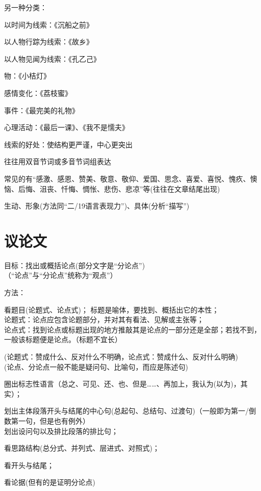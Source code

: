 另一种分类：\begin{asparaenum}[(1)]\item 以时间为线索：《沉船之前》
              \item 以人物行踪为线索：《故乡》
              \item 以人物见闻为线索：《孔乙己》
              \item 物：《小桔灯》
              \item 感情变化：《荔枝蜜》
              \item 事件：《最完美的礼物》
              \item 心理活动：《最后一课》、《我不是懦夫》\end{asparaenum}

线索的好处：使结构更严谨，中心更突出

  往往用双音节词或多音节词组表达

  常见的有``感激、感恩、赞美、敬意、敬仰、爱国、思念、喜爱、喜悦、愧疚、懊恼、后悔、沮丧、忏悔、惆怅、悲伤、悲凉''等(往往在文章结尾出现)

  生动、形象(方法同``二/19语言表现力'')、具体(分析``描写'')

\section{议论文}
目标：找出或概括论点(部分文字是``分论点'')\\
（``论点''与``分论点''统称为``观点''）\par
方法：\begin{asparaenum}[(1)]\item 看题目(论题式、论点式)；
标题是喻体，要找到、概括出它的本性；\\
论题式：论点应包含论题部分，并对其有看法、见解或主张等；\\
论点式：找到论点或标题出现的地方推敲其是论点的一部分还是全部；若找不到，一般该标题便是论点。（标题不宜长）\par
(论题式：赞成什么、反对什么不明确，论点式：赞成什么、反对什么明确)\\
(论点、分论点一般不能是疑问句、比喻句，而应是陈述句)

\item 圈出标志性语言（总之、可见、还、也、但是\ldots{}\ldots{}、再加上，我认为(以为)，其实）；
\item 划出主体段落开头与结尾的中心句(总起句、总结句、过渡句)（一般即为第一/倒数第一句，但是也有例外）\\划出设问句以及排比段落的排比句；
\item 看思路结构(总分式、并列式、层进式、对照式)；
\item 看开头与结尾；
\item 看论据(但有的是证明分论点)
\end{asparaenum}

